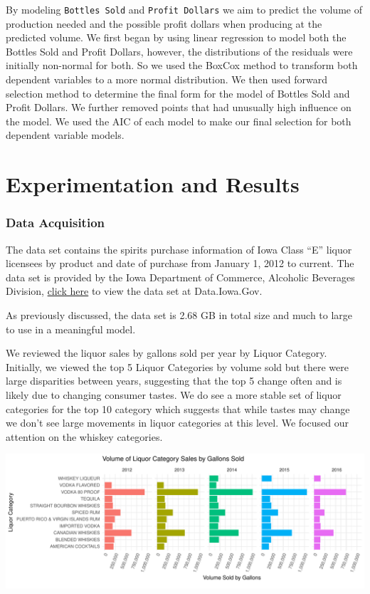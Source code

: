 \documentclass[]{elsarticle} %
\makeatletter
\def\maxwidth{\ifdim\Gin@nat@width>\linewidth\linewidth
\else\Gin@nat@width\fi}
\let\Oldincludegraphics\includegraphics
\renewcommand{\includegraphics}[1]{\Oldincludegraphics[width=\maxwidth]{#1}}
\makeatother
\begin{document}
By modeling \texttt{Bottles\ Sold} and \texttt{Profit\ Dollars} we aim
to predict the volume of production needed and the possible profit
dollars when producing at the predicted volume. We first began by using
linear regression to model both the Bottles Sold and Profit Dollars,
however, the distributions of the residuals were initially non-normal
for both. So we used the BoxCox method to transform both dependent
variables to a more normal distribution. We then used forward selection
method to determine the final form for the model of Bottles Sold and
Profit Dollars. We further removed points that had unusually high
influence on the model. We used the AIC of each model to make our final
selection for both dependent variable models.

\section{Experimentation and Results}\label{experimentation-and-results}

\subsubsection{Data Acquisition}\label{data-acquisition}

The data set contains the spirits purchase information of Iowa Class
``E'' liquor licensees by product and date of purchase from January 1,
2012 to current. The data set is provided by the Iowa Department of
Commerce, Alcoholic Beverages Division,
\href{https://data.iowa.gov/Economy/Iowa-Liquor-Sales/m3tr-qhgy}{click
here} to view the data set at Data.Iowa.Gov.

As previously discussed, the data set is 2.68 GB in total size and much
to large to use in a meaningful model.

We reviewed the liquor sales by gallons sold per year by Liquor
Category. Initially, we viewed the top 5 Liquor Categories by volume
sold but there were large disparities between years, suggesting that the
top 5 change often and is likely due to changing consumer tastes. We do
see a more stable set of liquor categories for the top 10 category which
suggests that while tastes may change we don't see large movements in
liquor categories at this level. We focused our attention on the whiskey
categories.

\includegraphics{Final_Project_files/figure-latex/unnamed-chunk-6-1.pdf}
\end{document}

